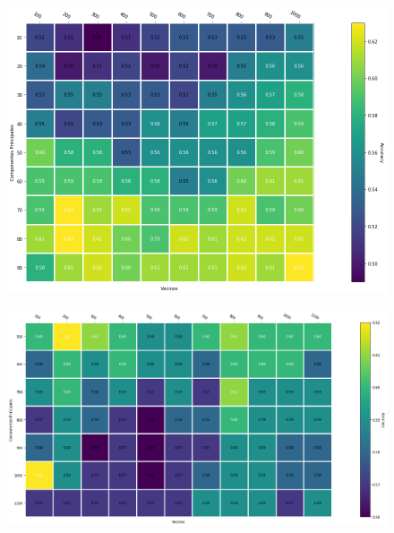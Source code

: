 \begin{figure}[h]
  \includegraphics[width=\textwidt]{./img/parameters-search-small.png}
\end{figure}

\begin{figure}[h]
  \includegraphics[width=\textwidt]{./img/parameters-search-big.png}
\end{figure}

